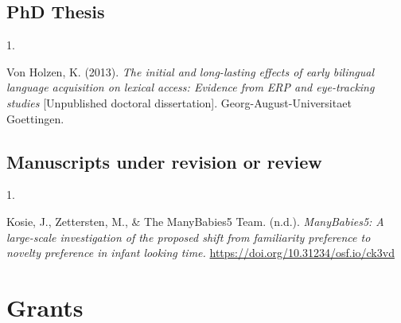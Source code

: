 \documentclass[10pt,a4paper,]{article}
\newlength{\cslhangindent}
\newlength{\csllabelwidth}
\newcommand{\CSLLeftMargin}[1]{\parbox[t]{\csllabelwidth}{\hfill #1~}}
\newcommand{\CSLRightInline}[1]{\parbox[t]{\linewidth - \cslhangindent - \csllabelwidth}{#1}\vspace{0.8ex}}
\begin{document}
\hypertarget{phd-thesis}{%
\subsection{PhD Thesis}\label{phd-thesis}}

\hypertarget{bibliography}{}
\leavevmode{}%
\CSLLeftMargin{1. }%
\CSLRightInline{Von Holzen, K. (2013). \emph{The initial and
long-lasting effects of early bilingual language acquisition on lexical
access: Evidence from ERP and eye-tracking studies} {[}Unpublished
doctoral dissertation{]}. Georg-August-Universitaet Goettingen.}

\hypertarget{manuscripts-under-revision-or-review}{%
\subsection{Manuscripts under revision or
review}\label{manuscripts-under-revision-or-review}}

\hypertarget{bibliography}{}
\leavevmode{}%
\CSLLeftMargin{1. }%
\CSLRightInline{Kosie, J., Zettersten, M., \& The ManyBabies5 Team.
(n.d.). \emph{ManyBabies5: A large-scale investigation of the proposed
shift from familiarity preference to novelty preference in infant
looking time.} \url{https://doi.org/10.31234/osf.io/ck3vd}}

\hypertarget{grants}{%
\section{Grants}\label{grants}}
\end{document}
